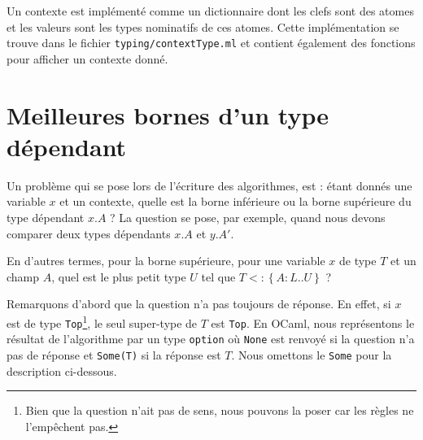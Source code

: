Un contexte est implémenté comme un dictionnaire dont les clefs sont des atomes
et les valeurs sont les types nominatifs de ces atomes. Cette implémentation se
trouve dans le fichier \verb|typing/contextType.ml| et contient également
des fonctions pour afficher un contexte donné.


%

\section{Meilleures bornes d'un type dépendant}

Un problème qui se pose lors de l'écriture des algorithmes, est : étant donnés une variable
$x$ et un contexte, quelle est la borne inférieure ou la borne supérieure du
type dépendant $x.A$ ? La question se pose, par exemple, quand nous devons
comparer deux types dépendants $x.A$ et $y.A'$.

En d'autres termes, pour la borne supérieure, pour une variable $x$ de type $T$ et
un champ $A$, quel est le plus petit type $U$ tel que $T <: \left\{ A : L .. U
\right\}$ ?

Remarquons d'abord que la question n'a pas toujours de réponse. En effet, si $x$
est de type \verb|Top|\footnote{Bien que la question n'ait pas de sens, nous
  pouvons la poser car les règles ne l'empêchent pas.}, le seul super-type de
$T$ est \verb|Top|. En OCaml, nous représentons le résultat de l'algorithme par un
type \verb|option| où \verb|None| est renvoyé si la question n'a pas de réponse
et \verb|Some(T)| si la réponse est $T$. Nous omettons le \verb|Some| pour la
description ci-dessous.

